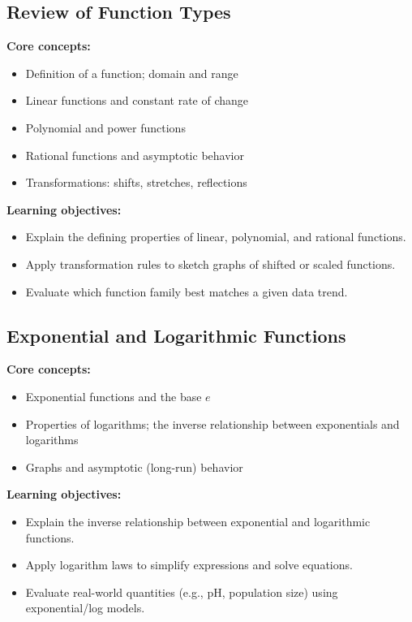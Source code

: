 \documentclass{article}
\begin{document}
\subsection{Review of Function Types}
\textbf{Core concepts:}
\begin{itemize}[leftmargin=*]
  \item Definition of a function; domain and range
  \item Linear functions and constant rate of change
  \item Polynomial and power functions
  \item Rational functions and asymptotic behavior
  \item Transformations: shifts, stretches, reflections
\end{itemize}
\textbf{Learning objectives:}
\begin{itemize}[leftmargin=*]
  \item Explain the defining properties of linear, polynomial, and rational functions.
  \item Apply transformation rules to sketch graphs of shifted or scaled functions.
  \item Evaluate which function family best matches a given data trend.
\end{itemize}

\subsection{Exponential and Logarithmic Functions}
\textbf{Core concepts:}
\begin{itemize}[leftmargin=*]
  \item Exponential functions and the base $e$
  \item Properties of logarithms; the inverse relationship between exponentials and logarithms
  \item Graphs and asymptotic (long-run) behavior
\end{itemize}
\textbf{Learning objectives:}
\begin{itemize}[leftmargin=*]
  \item Explain the inverse relationship between exponential and logarithmic functions.
  \item Apply logarithm laws to simplify expressions and solve equations.
  \item Evaluate real-world quantities (e.g., pH, population size) using exponential/log models.
\end{itemize}
\end{document}
